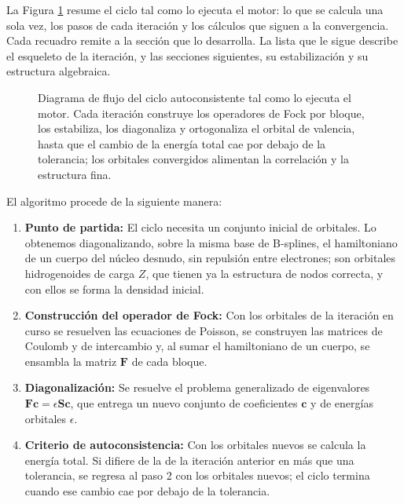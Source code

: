 La Figura \ref{fig:scf-cycle} resume el ciclo tal como lo ejecuta el motor: lo que se calcula una sola vez, los pasos de cada iteración y los cálculos que siguen a la convergencia. Cada recuadro remite a la sección que lo desarrolla. La lista que le sigue describe el esqueleto de la iteración, y las secciones siguientes, su estabilización y su estructura algebraica.

\begin{figure}[p]
  \centering
  
  \caption[Diagrama de flujo del ciclo autoconsistente]{Diagrama de flujo del ciclo autoconsistente tal como lo ejecuta el motor. Cada iteración construye los operadores de Fock por bloque, los estabiliza, los diagonaliza y ortogonaliza el orbital de valencia, hasta que el cambio de la energía total cae por debajo de la tolerancia; los orbitales convergidos alimentan la correlación y la estructura fina.}
  \label{fig:scf-cycle}
\end{figure}

\clearpage

El algoritmo procede de la siguiente manera:

\begin{enumerate}
    \item \textbf{Punto de partida:} El ciclo necesita un conjunto inicial de orbitales. Lo obtenemos diagonalizando, sobre la misma base de B-splines, el hamiltoniano de un cuerpo del núcleo desnudo, sin repulsión entre electrones; son orbitales hidrogenoides de carga $Z$, que tienen ya la estructura de nodos correcta, y con ellos se forma la densidad inicial.
    \item \textbf{Construcción del operador de Fock:} Con los orbitales de la iteración en curso se resuelven las ecuaciones de Poisson, se construyen las matrices de Coulomb y de intercambio y, al sumar el hamiltoniano de un cuerpo, se ensambla la matriz $\bm{F}$ de cada bloque.
    \item \textbf{Diagonalización:} Se resuelve el problema generalizado de eigenvalores $\bm{F}\bm{c} = \epsilon\bm{S}\bm{c}$, que entrega un nuevo conjunto de coeficientes $\bm{c}$ y de energías orbitales $\epsilon$.
    \item \textbf{Criterio de autoconsistencia:} Con los orbitales nuevos se calcula la energía total. Si difiere de la de la iteración anterior en más que una tolerancia, se regresa al paso 2 con los orbitales nuevos; el ciclo termina cuando ese cambio cae por debajo de la tolerancia.
\end{enumerate}

